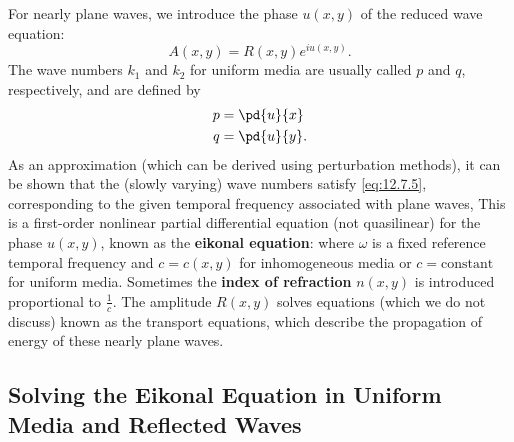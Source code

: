For nearly plane waves, we introduce the phase $u(x,y)$ of the reduced wave equation:
\begin{equation}
\label{eq:12.7.6}
A(x,y) = R(x,y)e^{iu(x,y)}.
\end{equation}
The wave numbers $k_1$ and $k_2$ for uniform media are usually called $p$ and $q$, respectively, and are defined by
\begin{align}
\label{eq:12.7.7}
p &= \pd{u}{x} \\
\label{eq:12.7.8}
q &= \pd{u}{y}.
\end{align}
As an approximation (which can be derived using perturbation methods), it can be shown that the (slowly varying) wave numbers satisfy \eqref{eq:12.7.5}, corresponding to the given temporal frequency associated with plane waves,
This is a first-order nonlinear partial differential equation (not quasilinear) for the phase $u(x,y)$, known as the \textbf{eikonal equation}:
where $\omega$ is a fixed reference temporal frequency and $c = c(x,y)$ for inhomogeneous media or $c = \text{constant}$ for uniform media.  Sometimes the \textbf{index of refraction} $n(x,y)$ is introduced proportional to $\frac{1}{c}$.  The amplitude $R(x,y)$ solves equations (which we do not discuss) known as the transport equations, which describe the propagation of energy of these nearly plane waves.

\subsection{Solving the Eikonal Equation in Uniform Media and Reflected Waves}
\label{sec:eikonal-uniform}


